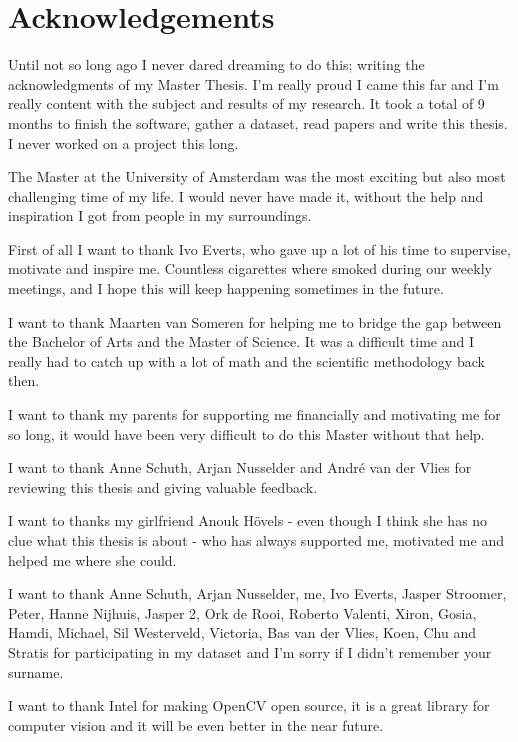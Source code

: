 \documentclass[a4paper, 11pt]{book}
\begin{document}
\tableofcontents{}

\chapter*{Acknowledgements}
Until not so long ago I never dared dreaming to do this; writing the acknowledgments of my Master Thesis. I'm really proud I came this far and I'm really content with the subject and results of my research. It took a total of 9 months to finish the software, gather a dataset, read papers and write this thesis. I never worked on a project this long.

The Master at the University of Amsterdam was the most exciting but also most challenging time of my life. I would never have made it, without the help and inspiration I got from people in my surroundings. 

First of all I want to thank Ivo Everts, who gave up a lot of his time to supervise, motivate and inspire me. Countless cigarettes where smoked during our weekly meetings, and I hope this will keep happening sometimes in the future.

I want to thank Maarten van Someren for helping me to bridge the gap between the Bachelor of Arts and the Master of Science. It was a difficult time and I really had to catch up with a lot of math and the scientific methodology back then. 

I want to thank my parents for supporting me financially and motivating me for so long, it would have been very difficult to do this Master without that help.

I want to thank Anne Schuth, Arjan Nusselder and Andr\'{e} van der Vlies for reviewing this thesis and giving valuable feedback.

I want to thanks my girlfriend Anouk H\"{o}vels - even though I think she has no clue what this thesis is about - who has always supported me, motivated me and helped me where she could.

I want to thank Anne Schuth, Arjan Nusselder, me, Ivo Everts, Jasper Stroomer, Peter, Hanne Nijhuis, Jasper 2, Ork de Rooi, Roberto Valenti, Xiron, Gosia, Hamdi, Michael, Sil Westerveld, Victoria, Bas van der Vlies, Koen, Chu and Stratis for participating in my dataset and I'm sorry if I didn't remember your surname. 

I want to thank Intel for making OpenCV open source, it is a great library for computer vision and it will be even better in the near future. 
\end{document}
